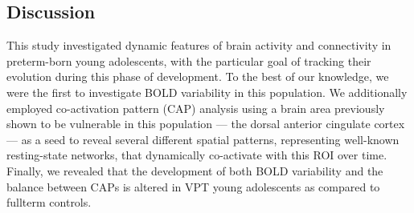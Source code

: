 \subsection{Discussion}

This study investigated dynamic features of brain activity and connectivity in preterm-born young adolescents, with the particular goal of tracking their evolution during this phase of development. To the best of our knowledge, we were the first to investigate BOLD variability in this population.  We additionally employed co-activation pattern (CAP) analysis using a brain area previously shown to be vulnerable in this population --- the dorsal anterior cingulate cortex --- as a seed to reveal several different spatial patterns, representing well-known resting-state networks, that dynamically co-activate with this ROI over time. Finally, we revealed that the development of both BOLD variability and the balance between CAPs is altered in VPT young adolescents as compared to fullterm controls. 


